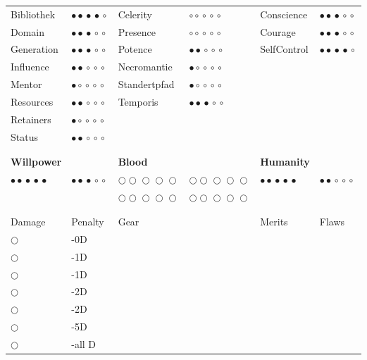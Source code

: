 \documentclass[a4paper,13pt]{scrartcl}
\begin{document}
\begin{table}
\begin{tabular}{ >{\RaggedLeft}p{25mm} >{\RaggedRight}p{25mm} >{\RaggedLeft}p{25mm}  >{\RaggedRight}p{25mm} >{\RaggedLeft}p{25mm} >{\RaggedRight}p{25mm}}
		Bibliothek			&	$\bullet\!\bullet\!\bullet\!\bullet\!\circ$ &
		Celerity 			&	$\circ\!\circ\!\circ\!\circ\!\circ$ 		&
		Conscience 			&	$\bullet\!\bullet\!\bullet\!\circ\!\circ$	\\
		Domain 				&	$\bullet\!\bullet\!\bullet\!\circ\!\circ$	&
		Presence 			&	$\circ\!\circ\!\circ\!\circ\!\circ$ 		&
		Courage 			&	$\bullet\!\bullet\!\bullet\!\circ\!\circ$	\\
		Generation 			&	$\bullet\!\bullet\!\bullet\!\circ\!\circ$ 	&
		Potence 			&	$\bullet\!\bullet\!\circ\!\circ\!\circ$ 	&
		SelfControl		 	&	$\bullet\!\bullet\!\bullet\!\bullet\!\circ$	\\
		Influence 			&	$\bullet\!\bullet\!\circ\!\circ\!\circ$ 	&
		Necromantie 		&	$\bullet\!\circ\!\circ\!\circ\!\circ$		&
							&												\\
		Mentor 				&	$\bullet\!\circ\!\circ\!\circ\!\circ$ 		&
		Standertpfad		& 	$\bullet\!\circ\!\circ\!\circ\!\circ$ 		&
							&												\\
		Resources 			&	$\bullet\!\bullet\!\circ\!\circ\!\circ$ 	&
		Temporis 			&	$\bullet\!\bullet\!\bullet\!\circ\!\circ$ 	&
							&										 		\\
		Retainers 			&	$\bullet\!\circ\!\circ\!\circ\!\circ$ 		&
							& 												&
							&												\\
		Status 				&	$\bullet\!\bullet\!\circ\!\circ\!\circ$ 	&
							&												&
							&												\\
 & &&& &\\
&& & & &\\


		\textbf{Willpower} 	&												&
		\textbf{Blood} 	 	&												&
		\textbf{Humanity} 	&												\\

		$\bullet\!\bullet\!\bullet\!\bullet\!\bullet$ 		& 	$\bullet\!\bullet\!\bullet\!\circ\!\circ$ 			&
		$\bigcirc\!\bigcirc\!\bigcirc\!\bigcirc\!\bigcirc$ 	& 	$\bigcirc\!\bigcirc\!\bigcirc\!\bigcirc\!\bigcirc$	&
		$\bullet\!\bullet\!\bullet\!\bullet\!\bullet$ 		& 	$\bullet\!\bullet\!\circ\!\circ\!\circ$ 			\\
															&														&
		$\bigcirc\!\bigcirc\!\bigcirc\!\bigcirc\!\bigcirc$	&	$\bigcirc\!\bigcirc\!\bigcirc\!\bigcirc\!\bigcirc$ 	&
	 														&														\\
	& &&& &\\
	&&&&&\\
		 Damage & Penalty & Gear &&Merits& Flaws	\\
		$\bigcirc$& -0D&&&\\
		$\bigcirc$&-1D&&&\\
		$\bigcirc$&-1D&&&\\
		$\bigcirc$&-2D&&&\\
		$\bigcirc$&-2D&&&\\
		$\bigcirc$&-5D&&&\\
		$\bigcirc$&-all D&&&\\


\end{tabular}
\end{table}
\end{document}

